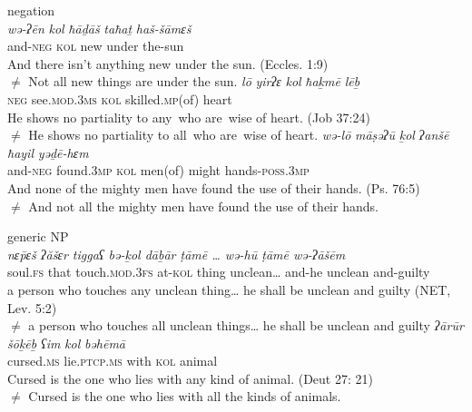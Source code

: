 \documentclass[output=paper]{langsci/langscibook}
\begin{document}
 \ea
 negation\label{ex:doron:37}\\
 \ea
 \gll \textit{wə-ʔēn}     \textit{kol}   \textit{ħāḏāš}  \textit{taħaṯ}  \textit{haš-šāmɛš}\\
      and-\textsc{neg}  \textsc{kol} new     under the-sun\\
 \glt And there isn’t anything new under the sun. (Eccles. 1:9)\\${\neq}$  Not all new things are under the sun. 
 \ex
 \gll \textit{lō}      \textit{yirʔɛ}                \textit{kol}   \textit{ħaḵmē}              \textit{lēḇ}  \\
      \textsc{neg}  see.\textsc{mod.3ms}   \textsc{kol} skilled\textsc{.mp}(of)  heart\\
 \glt He shows no partiality to any~who are~wise of heart. (Job 37:24)\\${\neq}$  He shows no partiality to all~who are~wise of heart. 
 \ex
 \gll \textit{wə-lō}       \textit{māṣəʔū}      \textit{ḵol}   \textit{ʔanšē}     \textit{ħayil}    \textit{yəḏē-hɛm}\\
      and-\textsc{neg} found.\textsc{3mp}  \textsc{kol} men(of) might  hands{}-\textsc{poss.3mp}\\
 \glt And none of the mighty men have found the use of their hands. (Ps. 76:5)\\${\neq}$  And not all the mighty men have found the use of their hands.
 \z
\z



\ea%
    generic NP\label{ex:doron:38}\\
    \ea
    \gll \textit{nɛ\={p}ɛš      ʔăšɛr tiggaʕ                bə-ḵol  dāḇār  ṭāmē …     wə-hū    ṭāmē      wə-ʔāšēm}\\
         soul.\textsc{fs}   that   touch.\textsc{mod.3fs}  at-\textsc{kol} thing  unclean… and-he   unclean and-guilty\\
    \glt a person who touches any unclean thing… he shall be unclean and guilty (NET, Lev. 5:2)\\${\neq}$   a person who touches all unclean things… he shall be unclean and guilty 
    \ex  
    \gll \textit{ʔārūr}          \textit{šōḵēḇ}          \textit{ʕim}   \textit{kol}   \textit{bəhēmā}\\
         cursed.\textsc{ms}  lie.\textsc{ptcp.ms}  with \textsc{kol} animal\\
    \glt Cursed is the one who lies with any kind of animal. (Deut 27: 21)\\${\neq}$  Cursed is the one who lies with all the kinds of animals.
    \z
\z
\end{document}
